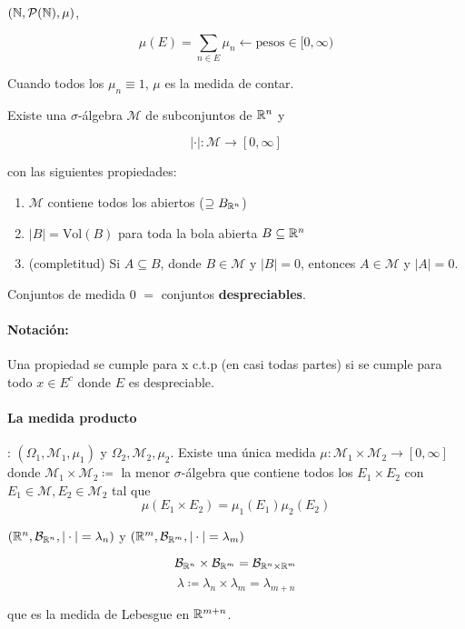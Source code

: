 \begin{fexample}
    $(\mathbb{N},\mathcal{P}(\mathbb{N}),\mu)$,

    \[\mu(E)=\sum_{n\in E}\mu_n \leftarrow \text{pesos}\in [0,\infty)\]

    Cuando todos los $\mu_n\equiv 1$, $\mu$ es la medida de contar.
\end{fexample}

\begin{ftheorem}
    Existe una $\sigma$-álgebra $\mathcal{M}$ de subconjuntos de $\mathbb{R}^n$ y 

    \[|\cdot|:\mathcal{M}\to[0,\infty]\]

    con las siguientes propiedades:

    \begin{enumerate}
        \item $\mathcal{M}$ contiene todos los abiertos ($\supseteq B_{\mathbb{R}^n}$)
        \item $|B|=\text{Vol} (B)$ para toda la bola abierta $B\subseteq \mathbb{R}^n$
        \item (completitud) Si $A\subseteq B$, donde $B\in\mathcal{M}$ y $|B|=0$, entonces $A\in\mathcal{M}$ y $|A|=0$.
    \end{enumerate}
\end{ftheorem}

Conjuntos de medida 0 $=$ conjuntos \textbf{despreciables}.

\paragraph{Notación:} Una propiedad se cumple para x c.t.p (en casi todas partes) si se cumple para todo $x\in E^c$ donde $E$ es despreciable.

\paragraph{La medida producto}: $(\Omega_1,\mathcal{M}_1,\mu_1)$ y $\Omega_2,\mathcal{M}_2,\mu_2$. Existe una única medida $\mu:\mathcal{M}_1\times \mathcal{M}_2\to[0,\infty]$ donde $\mathcal{M}_1\times \mathcal{M}_2\coloneqq$ la menor $\sigma$-álgebra que contiene todos los $E_1\times E_2$ con $E_1\in\mathcal{M},E_2\in\mathcal{M}_2$ tal que 
\[\mu(E_1\times E_2)=\mu_1(E_1)\mu_2(E_2)\]

\begin{fexample}
    $(\mathbb{R}^n,\mathcal{B}_{\mathbb{R}^n},|\cdot|=\lambda_n)$ y $(\mathbb{R}^m, \mathcal{B}_{\mathbb{R}^m},|\cdot|=\lambda_m)$

    \[\mathcal{B}_{\mathbb{R}^n}\times \mathcal{B}_{\mathbb{R}^m}=\mathcal{B}_{\mathbb{R}^n\times \mathbb{R}^m}\]
    \[\lambda\coloneqq \lambda_n\times \lambda_m=\lambda_{m+n}\]

    que es la medida de Lebesgue en $\mathbb{R}^{m+n}$.
\end{fexample}

